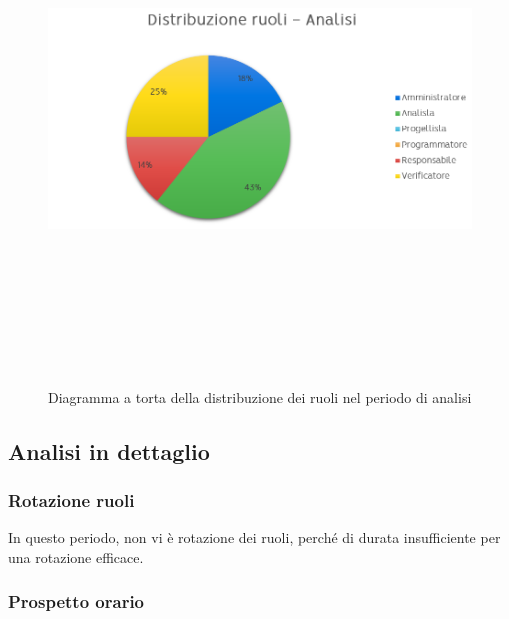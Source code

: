                 
                    \begin{figure}[htbp]
                    	\centering
                        \includegraphics[width=14cm,height=14cm,keepaspectratio]{./img/ProspettoOrario/SRAnalisi.png}
                        \caption[Analisi - Diagramma a torta suddivisione ruoli]{Diagramma a torta della distribuzione dei ruoli nel periodo di analisi}
                    \end{figure}
                

\newpage

    \subsection{Analisi in dettaglio}

        \subsubsection{Rotazione ruoli}

            In questo periodo, non vi è rotazione dei ruoli, perché di durata insufficiente per una rotazione efficace.

        \subsubsection{Prospetto orario}

